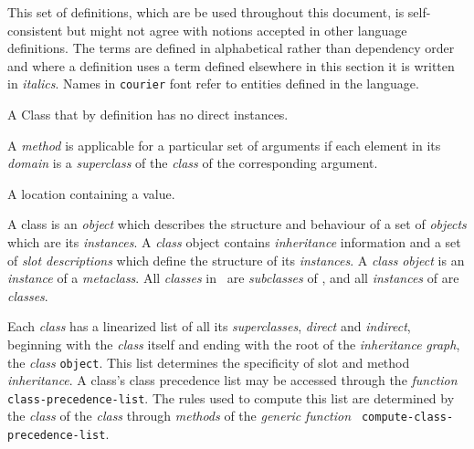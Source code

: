 \begin{optPrivate}
\end{optPrivate}
\begin{optDefinition}
\label{sec:definitions}
This set of definitions, which are be used throughout this document, is
self-consistent but might not agree with notions accepted in other language
definitions.  The terms are defined in alphabetical rather than dependency order
and where a definition uses a term defined elsewhere in this section it is
written in {\em italics}.  Names in {\tt courier} font refer to entities defined
in the language.
%
\begin{definitions}
    A Class that by definition has no direct instances.

     
     A {\em method} is applicable for a
    particular set of arguments if each element in its {\em domain} is a {\em
        superclass} of the {\em class} of the corresponding argument.

    A location containing a value.

     A class is an {\em object} which
    describes the structure and behaviour of a set of {\em objects} which are
    its {\em instances}.  A {\em class} object contains {\em inheritance}
    information and a set of {\em slot descriptions} which define the structure
    of its {\em instances}.  A {\em class} {\em object} is an {\em instance} of
    a {\em metaclass}.  All {\em classes} in \eulisp\ are {\em subclasses} of
    {}, and all {\em instances} of {} are {\em
        classes}.

     
    Each {\em class} has a linearized list of all its {\em superclasses}, {\em
        direct} and {\em indirect}, beginning with the {\em class} itself and
    ending with the root of the {\em inheritance} {\em graph}, the {\em class}
    {\tt object}.  This list determines the specificity of slot and method {\em
        inheritance}.  A class's class precedence list may be accessed through
    the {\em function} {\tt class-precedence-list}. The rules used to compute
    this list are determined by the {\em class} of the {\em class} through {\em
        methods} of the {\em generic} {\em function} {\tt
        compute-class-precedence-list}.


\end{definitions}
\end{optDefinition}
